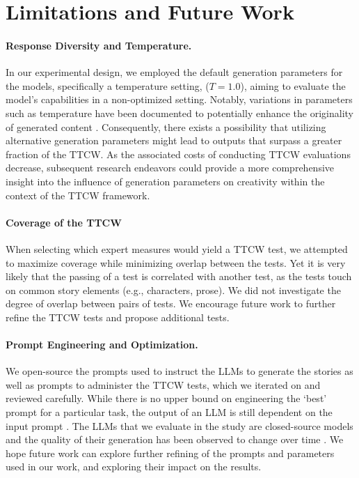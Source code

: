 \section{Limitations and Future Work}

\paragraph{Response Diversity and Temperature.} In our experimental design, we employed the default generation parameters for the models, specifically a temperature setting, ($T=1.0$), aiming to evaluate the model's capabilities in a non-optimized setting. Notably, variations in parameters such as temperature have been documented to potentially enhance the originality of generated content \cite{roemmele2018automated}. Consequently, there exists a possibility that utilizing alternative generation parameters might lead to outputs that surpass a greater fraction of the TTCW. As the associated costs of conducting TTCW evaluations decrease, subsequent research endeavors could provide a more comprehensive insight into the influence of generation parameters on creativity within the context of the TTCW framework.

\paragraph{Coverage of the TTCW}
When selecting which expert measures would yield a TTCW test, we attempted to maximize coverage while minimizing overlap between the tests. Yet it is very likely that the passing of a test is correlated with another test, as the tests touch on common story elements (e.g., characters, prose). We did not investigate the degree of overlap between pairs of tests. We encourage future work to further refine the TTCW tests and propose additional tests.

\paragraph{Prompt Engineering and Optimization.}
We open-source the prompts used to instruct the LLMs to generate the stories as well as prompts to administer the TTCW tests, which we iterated on and reviewed carefully. While there is no upper bound on engineering the `best' prompt for a particular task, the output of an LLM is still dependent on the input prompt \cite{zhou2022large}. The LLMs that we evaluate in the study are closed-source models and the quality of their generation has been observed to change over time \cite{chen2023chatgpt}. We hope future work can explore further refining of the prompts and parameters used in our work, and exploring their impact on the results.

